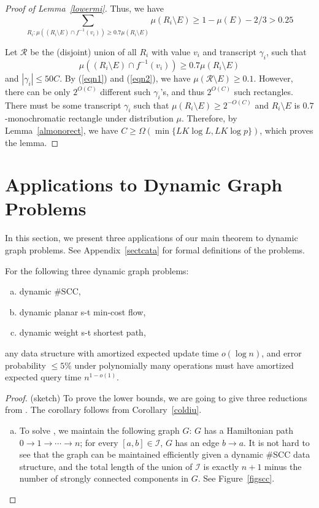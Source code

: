 \documentclass[11pt]{article}
\begin{document}
{\begin{proof}[Proof of Lemma~\ref{lowermi}]
Thus, we have
\begin{equation}\label{eqn2}
	\sum_{R_i:\mu((R_i\setminus E)\cap f^{-1}(v_i))\geq 0.7\mu(R_i\setminus E)}\mu(R_i\setminus E)\geq 1-\mu(E)-2/3>0.25
\end{equation}

Let $\mathcal{R}$ be the (disjoint) union of all $R_i$ with value $v_i$ and transcript $\gamma_i$, such that 
\[
	\mu((R_i\setminus E)\cap f^{-1}(v_i))\geq 0.7\mu(R_i\setminus E)
\]
and $|\gamma_i|\leq 50C$. By (\ref{eqn1}) and (\ref{eqn2}), we have $\mu(\mathcal{R}\setminus E)\geq 0.1$. However, there can be only $2^{O(C)}$ different such $\gamma_i$'s, and thus $2^{O(C)}$ such rectangles. There must be some transcript $\gamma_i$ such that $\mu(R_i\setminus E)\geq 2^{-O(C)}$ and $R_i\setminus E$ is $0.7$-monochromatic rectangle under distribution $\mu$. Therefore, by Lemma~\ref{almonorect}, we have $C\geq \Omega(\min\{LK\log L, LK\log p\})$, which proves the lemma. 

\end{proof}

\section{Applications to Dynamic Graph Problems}\label{sectapp}
In this section, we present three applications of our main theorem to dynamic graph problems. See Appendix~\ref{sectcata} for formal definitions of the problems.

\begin{corollary}\label{cordyngraph}
For the following three dynamic graph problems:
\begin{enumerate}[(a)]
	\item
		dynamic \#SCC,
	\item
		dynamic planar s-t min-cost flow,
	\item
		dynamic weight s-t shortest path,
\end{enumerate}
any data structure with amortized expected update time $o(\log n)$, and error probability $\leq 5\%$ under polynomially many operations must have amortized expected query time $n^{1-o(1)}$. 
\end{corollary}

\begin{proof}(sketch)
To prove the lower bounds, we are going to give three reductions from \diu{}. The corollary follows from Corollary~\ref{coldiu}. 
\begin{enumerate}[(a)]
	\item To solve \diu{}, we maintain the following graph $G$: $G$ has a Hamiltonian path $0\rightarrow 1\rightarrow \cdots \rightarrow n$; for every $[a, b]\in \mathcal{I}$, $G$ has an edge $b\rightarrow a$. It is not hard to see that the graph can be maintained efficiently given a dynamic \#SCC data structure, and the total length of the union of $\mathcal{I}$ is exactly $n+1$ minus the number of strongly connected components in $G$. See Figure~\ref{figscc}. 
	

\end{enumerate}
\end{proof}}
\end{document}
